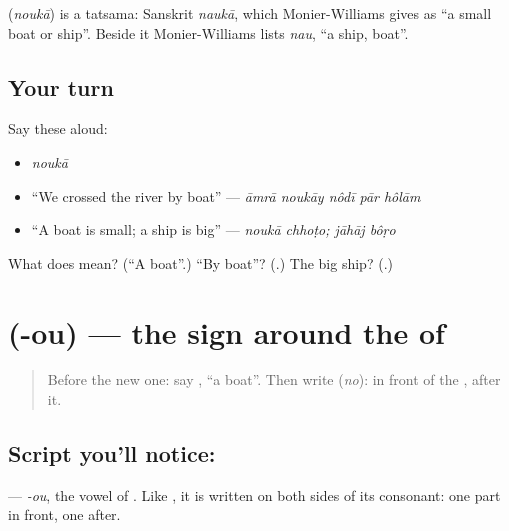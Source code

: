 \begin{cousinweb}
\textbf{} (\emph{noukā}) is a tatsama: Sanskrit \emph{naukā}, which Monier-Williams gives as \textquotedblleft{}a small boat or ship\textquotedblright{}. Beside it Monier-Williams lists \emph{nau}, \textquotedblleft{}a ship, boat\textquotedblright{}.
\end{cousinweb}

\subsection*{Your turn}
Say these aloud:

\begin{itemize}
\raggedright
  \item \emph{noukā}
  \item \textquotedblleft{}We crossed the river by boat\textquotedblright{} — \emph{āmrā noukāy nôdī pār hôlām}
  \item \textquotedblleft{}A boat is small; a ship is big\textquotedblright{} — \emph{noukā chhoṭo; jāhāj bôṛo}
\end{itemize}

\begin{tcolorbox}[breakable,colback=teal!4,colframe=teal!35!black,title={Before you move on}]
What does \textbf{} mean? (\textquotedblleft{}A boat\textquotedblright{}.) \textquotedblleft{}By boat\textquotedblright{}? (\textbf{}.) The big ship? (\textbf{}.)
\end{tcolorbox}
\section[\texorpdfstring{\bn{ৌ} (-ou)}{ৌ (-ou)}]{ (-ou) — the sign around the  of }

\label{lesson:BN-W271-letter-au-kar}



\begin{quote}
Before the new one: say \textbf{}, \textquotedblleft{}a boat\textquotedblright{}. Then write \textbf{} (\emph{no}): \textbf{} in front of the \textbf{}, \textbf{} after it.
\end{quote}

\subsection*{Script you'll notice: }
\textbf{} — \emph{-ou}, the vowel of \textbf{}. Like \textbf{}, it is written on both sides of its consonant: one part in front, one after.

